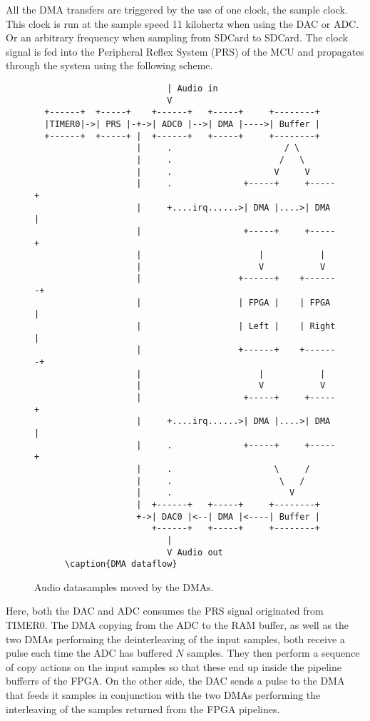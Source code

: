 All the DMA transfers are triggered by the use of one clock, the sample clock.
This clock is run at the sample speed 11 kilohertz when using the DAC or ADC. Or
an arbitrary frequency when sampling from SDCard to SDCard. The clock signal is fed into
the Peripheral Reflex System  (PRS) of the MCU and propagates
through the system using the following scheme.

\begin{figure}[H]
  \begin{verbatim}
                          | Audio in
                          V
  +------+  +-----+    +------+   +-----+     +--------+
  |TIMER0|->| PRS |-+->| ADC0 |-->| DMA |---->| Buffer |
  +------+  +-----+ |  +------+   +-----+     +--------+
                    |     .                      / \
                    |     .                     /   \
                    |     .                    V     V
                    |     .              +-----+     +-----+
                    |     +....irq......>| DMA |....>| DMA |
                    |                    +-----+     +-----+
                    |                       |           |
                    |                       V           V
                    |                   +------+    +-------+
                    |                   | FPGA |    | FPGA  |
                    |                   | Left |    | Right |
                    |                   +------+    +-------+
                    |                       |           |
                    |                       V           V
                    |                    +-----+     +-----+
                    |     +....irq......>| DMA |....>| DMA |
                    |     .              +-----+     +-----+
                    |     .                    \     /
                    |     .                     \   /
                    |     .                       V
                    |  +------+   +-----+     +--------+
                    +->| DAC0 |<--| DMA |<----| Buffer |
                       +------+   +-----+     +--------+
                          |
                          V Audio out
      \caption{DMA dataflow}
  \end{verbatim}
  \caption{Audio datasamples moved by the DMAs.}
  \label{mcu:dma-dataflow}
\end{figure}

Here, both the DAC and ADC consumes the PRS signal originated from TIMER0. The
DMA copying from the ADC to the RAM buffer, as well as the two DMAs performing the
deinterleaving of the input samples, both receive a pulse each time the ADC has
buffered $N$ samples. They then perform a sequence of copy actions on the input
samples so that these end up inside the pipeline bufferrs of the FPGA. On the
other side, the DAC sends a pulse to the DMA that feeds it samples in conjunction
with the two DMAs performing the interleaving of the samples returned from the
FPGA pipelines.

